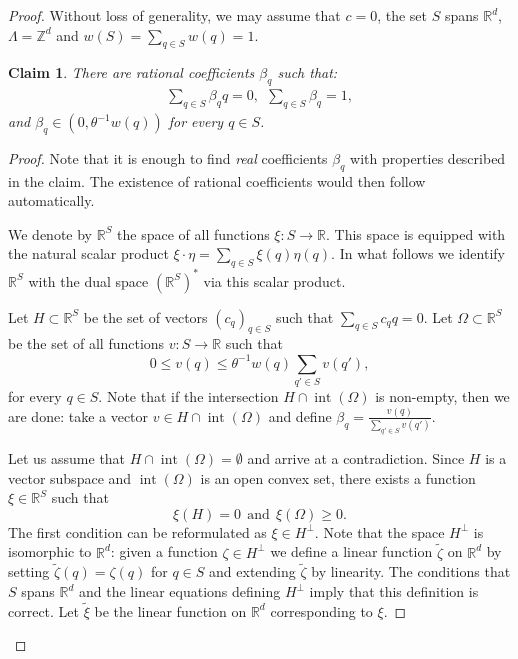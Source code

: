 \documentclass{daj}
\renewcommand{\le}{\leqslant}
\renewcommand{\ge}{\geqslant}
\newcommand{\R}{\mathbb R}
\newcommand{\Z}{\mathbb Z}
\newtheorem{claim}[theorem]{Claim}
\theoremstyle{definition}
\theoremstyle{remark}
\theoremstyle{definition}
\theoremstyle{definition}
\begin{document}
\begin{proof}
Without loss of generality, we may assume that $c = 0$, the set $S$ spans $\R^d$, $\Lambda = \Z^d$ and $w(S) = \sum_{q \in S} w(q) = 1$.

\begin{claim}\label{real}
There are rational coefficients $\beta_q$ such that:
\begin{align*}
    \sum_{q\in S} \beta_q q = 0,~~ \sum_{q \in S} \beta_q = 1, 
\end{align*}
and $\beta_q \in (0, \theta^{-1}w(q))$ for every $q\in S$.
\end{claim}
\begin{proof}

Note that it is enough to find {\em real} coefficients $\beta_q$ with properties described in the claim. The existence of rational coefficients would then follow automatically.

We denote by $\R^S$ the space of all functions $\xi: S \rightarrow \R$. This space is equipped with the natural scalar product $\xi \cdot \eta = \sum_{q \in S} \xi(q) \eta(q)$. In what follows we identify $\R^S$ with the dual space $(\R^S)^*$ via this scalar product.

Let $H \subset \R^S$ be the set of vectors $(c_q)_{q \in S}$ such that $\sum_{q \in S} c_q q = 0$. 
Let $\Omega \subset \R^S$ be the set of all functions $v: S \rightarrow \R$ such that 
$$
0 \le v(q) \le \theta^{-1}w(q) \sum_{q' \in S} v(q'),
$$
for every $q \in S$. Note that if the intersection $H \cap \operatorname{int}(\Omega)$ is non-empty, then we are done: take a vector $v \in H \cap \operatorname{int}(\Omega)$ and define $\beta_q = \frac{v(q)}{\sum_{q' \in S} v(q')}$.

Let us assume that $H \cap \operatorname{int}(\Omega) = \emptyset$ and arrive at a contradiction. Since $H$ is a vector subspace and $\operatorname{int}(\Omega)$ is an open convex set, there exists a function $\xi \in \R^S$ such that  
$$
\xi(H) = 0 ~~ {\text{and}} ~~\xi(\Omega) \ge 0.
$$
The first condition can be reformulated as $\xi \in H^\bot$.
Note that the space $H^\bot$ is isomorphic to $\R^d$: given a function $\zeta \in H^\bot$ we define a linear function $\tilde \zeta$ on $\R^d$ by setting $\tilde \zeta(q) = \zeta(q)$ for $q \in S$ and extending $\tilde \zeta$ by linearity. The conditions that $S$ spans $\R^d$ and the linear equations defining $H^{\bot}$ imply that this definition is correct. 
Let $\tilde \xi$ be the linear function on $\R^d$ corresponding to $\xi$.


\end{proof}
\end{proof}
\end{document}

